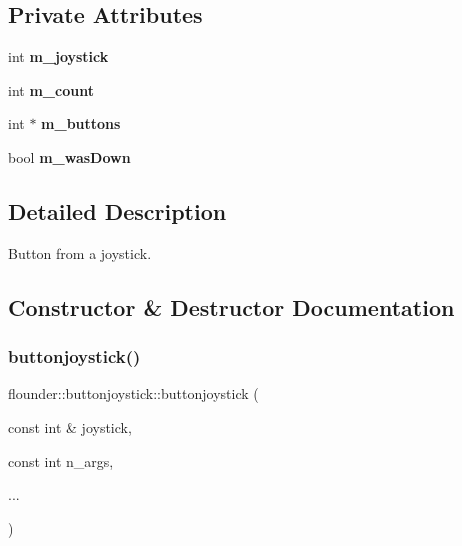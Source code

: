 \subsection*{Private Attributes}
\begin{DoxyCompactItemize}
\item 
\mbox{\label{classflounder_1_1buttonjoystick_a3a6e21dff8b11ac6a58cfae4d33093ab}} 
int {\bfseries m\+\_\+joystick}
\item 
\mbox{\label{classflounder_1_1buttonjoystick_a2fa5decb08acdaf813707747bfccccd9}} 
int {\bfseries m\+\_\+count}
\item 
\mbox{\label{classflounder_1_1buttonjoystick_ad7f15d3fc515ec73cbbb755883c5dd0e}} 
int $\ast$ {\bfseries m\+\_\+buttons}
\item 
\mbox{\label{classflounder_1_1buttonjoystick_a2338ec61fb31f2299d7373faedf33d24}} 
bool {\bfseries m\+\_\+was\+Down}
\end{DoxyCompactItemize}


\subsection{Detailed Description}
Button from a joystick. 



\subsection{Constructor \& Destructor Documentation}
\mbox{\label{classflounder_1_1buttonjoystick_a1b31996ff3588c033e85839aef2d35c8}} 
\subsubsection{\texorpdfstring{buttonjoystick()}{buttonjoystick()}}
{\footnotesize\ttfamily flounder\+::buttonjoystick\+::buttonjoystick (\begin{DoxyParamCaption}\item[{const int \&}]{joystick,  }\item[{const int}]{n\+\_\+args,  }\item[{}]{... }\end{DoxyParamCaption})}



